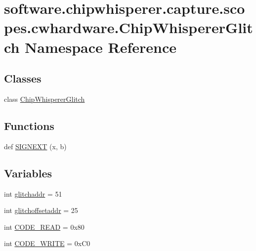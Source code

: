 \hypertarget{namespacesoftware_1_1chipwhisperer_1_1capture_1_1scopes_1_1cwhardware_1_1ChipWhispererGlitch}{}\section{software.\+chipwhisperer.\+capture.\+scopes.\+cwhardware.\+Chip\+Whisperer\+Glitch Namespace Reference}
\label{namespacesoftware_1_1chipwhisperer_1_1capture_1_1scopes_1_1cwhardware_1_1ChipWhispererGlitch}
\subsection*{Classes}
\begin{DoxyCompactItemize}
\item 
class \hyperlink{classsoftware_1_1chipwhisperer_1_1capture_1_1scopes_1_1cwhardware_1_1ChipWhispererGlitch_1_1ChipWhispererGlitch}{Chip\+Whisperer\+Glitch}
\end{DoxyCompactItemize}
\subsection*{Functions}
\begin{DoxyCompactItemize}
\item 
def \hyperlink{namespacesoftware_1_1chipwhisperer_1_1capture_1_1scopes_1_1cwhardware_1_1ChipWhispererGlitch_ae2bb44739036038b47bd62db2df4b185}{S\+I\+G\+N\+E\+X\+T} (x, b)
\end{DoxyCompactItemize}
\subsection*{Variables}
\begin{DoxyCompactItemize}
\item 
int \hyperlink{namespacesoftware_1_1chipwhisperer_1_1capture_1_1scopes_1_1cwhardware_1_1ChipWhispererGlitch_ae07d5046741e7341b51127ae3cfc6039}{glitchaddr} = 51
\item 
int \hyperlink{namespacesoftware_1_1chipwhisperer_1_1capture_1_1scopes_1_1cwhardware_1_1ChipWhispererGlitch_a4152d20f6b1e47093e5a66552b11d09c}{glitchoffsetaddr} = 25
\item 
int \hyperlink{namespacesoftware_1_1chipwhisperer_1_1capture_1_1scopes_1_1cwhardware_1_1ChipWhispererGlitch_aed668a4e83d5db567328fb8e2ecfe0a3}{C\+O\+D\+E\+\_\+\+R\+E\+A\+D} = 0x80
\item 
int \hyperlink{namespacesoftware_1_1chipwhisperer_1_1capture_1_1scopes_1_1cwhardware_1_1ChipWhispererGlitch_a9285ed127a4225afd9c39d87953c6724}{C\+O\+D\+E\+\_\+\+W\+R\+I\+T\+E} = 0x\+C0
\end{DoxyCompactItemize}


